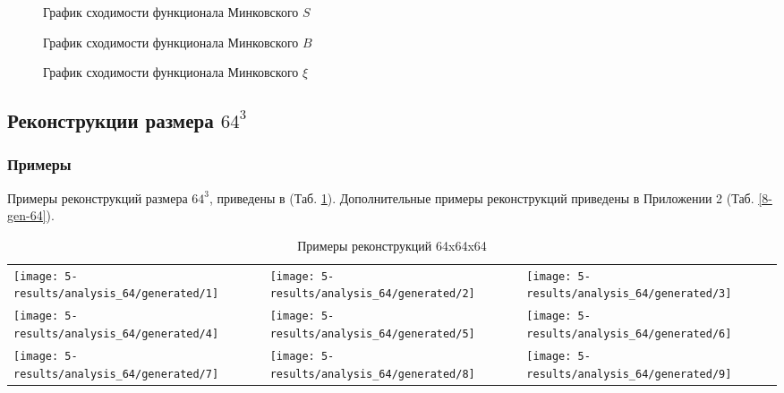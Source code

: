 		\begin{figure}[h]
			\caption{График сходимости функционала Минковского $S$}
			\label{S-plot}
		\end{figure}
	
		\begin{figure}[h]
			\caption{График сходимости функционала Минковского $B$}
			\label{B-plot}
		\end{figure}
	
		\begin{figure}[h]
			\caption{График сходимости функционала Минковского $\xi$}
			\label{Xi-plot}
		\end{figure}	
		
	
	\subsection{Реконструкции размера $64^3$}
		\subsubsection{Примеры}
			Примеры реконструкций размера $64^3$, приведены в (Таб. \ref{5-gen-64}). Дополнительные примеры реконструкций приведены в Приложении 2 (Таб. \ref{8-gen-64}).
			
			\begin{table}[h]
				\centering
				\begin{tabular}{p{5cm} p{5cm} p{5cm}}
					\toprule
					\texttt{[image: 5-results/analysis\_64/generated/1]}
					&
					\texttt{[image: 5-results/analysis\_64/generated/2]}
					&
					\texttt{[image: 5-results/analysis\_64/generated/3]}
					\\
					\texttt{[image: 5-results/analysis\_64/generated/4]}
					&
					\texttt{[image: 5-results/analysis\_64/generated/5]}
					&
					\texttt{[image: 5-results/analysis\_64/generated/6]}
					\\
					\texttt{[image: 5-results/analysis\_64/generated/7]}
					&
					\texttt{[image: 5-results/analysis\_64/generated/8]}
					&
					\texttt{[image: 5-results/analysis\_64/generated/9]}
					\\
					\bottomrule
				\end{tabular}
				\caption{Примеры реконструкций 64x64x64}
				\label{5-gen-64}
			\end{table} 
		
